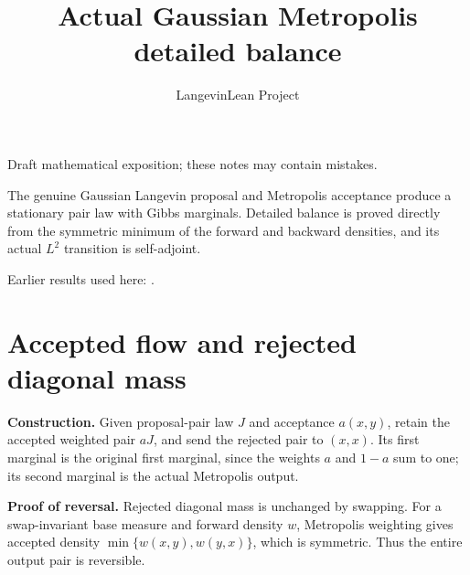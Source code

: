 \documentclass[11pt,a4paper]{article}
\title{\texorpdfstring{Actual Gaussian Metropolis detailed balance}{Actual Gaussian Metropolis detailed balance}}
\author{LangevinLean Project}
\date{}
\begin{document}
\maketitle
Draft mathematical exposition; these notes may contain mistakes.


The genuine Gaussian Langevin proposal and Metropolis acceptance produce a stationary pair law with Gibbs marginals. Detailed balance is proved directly from the symmetric minimum of the forward and backward densities, and its actual \(L^2\) transition is self-adjoint.



Earlier results used here: \cite[Section~3.39]{LangevinLean2026ULASC}.

\section{\texorpdfstring{Accepted flow and rejected diagonal mass}{Accepted flow and rejected diagonal mass}}


\textbf{Construction.} Given proposal-pair law \(J\) and acceptance \(a(x,y)\), retain the accepted weighted pair \(aJ\), and send the rejected pair to \((x,x)\). Its first marginal is the original first marginal, since the weights \(a\) and \(1-a\) sum to one; its second marginal is the actual Metropolis output.



\textbf{Proof of reversal.} Rejected diagonal mass is unchanged by swapping. For a swap-invariant base measure and forward density \(w\), Metropolis weighting gives accepted density \(\min\{w(x,y),w(y,x)\}\), which is symmetric. Thus the entire output pair is reversible.
\end{document}
